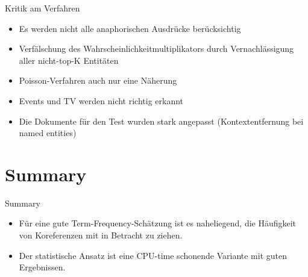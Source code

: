 \documentclass{beamer}
\begin{document}
\begin{frame}{Kritik am Verfahren}
	\begin{itemize}
		\item Es werden nicht alle anaphorischen Ausdrücke berücksichtig
		\item Verfälschung des Wahrscheinlichkeitmultiplikators durch Vernachlässigung aller nicht-top-K Entitäten
		\item Poisson-Verfahren auch nur eine Näherung
		\item Events und TV werden nicht richtig erkannt
		\item Die Dokumente für den Test wurden stark angepasst (Kontextentfernung bei named entities)
	\end{itemize}
\end{frame}


\section*{Summary}

\begin{frame}{Summary}

  \begin{itemize}
  \item
    Für eine gute Term-Frequency-Schätzung ist es naheliegend, die Häufigkeit von \alert{Koreferenzen} mit in Betracht zu ziehen.
  \item
    Der \alert{statistische Ansatz} ist eine CPU-time schonende Variante mit guten Ergebnissen.
  \end{itemize}
  
\end{frame}
\end{document}
